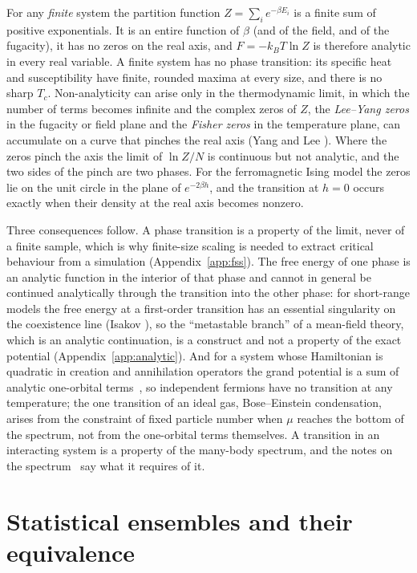 \documentclass[10pt,a4paper]{article}
\theoremstyle{remark}
\begin{document}
For any \emph{finite} system the partition function
$Z=\sum_ie^{-\beta E_i}$ is a finite sum of positive exponentials. It is an
entire function of $\beta$ (and of the field, and of the fugacity), it has no
zeros on the real axis, and $F=-k_BT\ln Z$ is therefore analytic in every
real variable. A finite system has no phase transition: its specific heat and
susceptibility have finite, rounded maxima at every size, and there is no
sharp $T_c$. Non-analyticity can arise only in the thermodynamic limit, in
which the number of terms becomes infinite and the complex zeros of $Z$, the
\emph{Lee--Yang zeros} in the fugacity or field plane and the \emph{Fisher
zeros} in the temperature plane, can accumulate on a curve that pinches the
real axis (Yang and Lee \cite{YangLee}). Where the zeros pinch the axis the
limit of $\ln Z/N$ is continuous but not analytic, and the two sides of the
pinch are two phases. For the ferromagnetic Ising model the zeros lie on the
unit circle in the plane of $e^{-2\beta h}$, and the transition at $h=0$
occurs exactly when their density at the real axis becomes nonzero.

Three consequences follow. A phase transition is a property of the limit,
never of a finite sample, which is why finite-size scaling is needed to
extract critical behaviour from a simulation (Appendix~\ref{app:fss}). The
free energy of one phase is an analytic function in the interior of that phase
and cannot in general be continued analytically through the transition into
the other phase: for short-range models the free energy at a first-order
transition has an essential singularity on the coexistence line (Isakov
\cite{Isakov}), so the ``metastable branch'' of a mean-field theory, which
is an analytic continuation, is a construct and not a property of the exact
potential (Appendix~\ref{app:analytic}). And for a system whose Hamiltonian is
quadratic in creation and annihilation operators the grand potential is a sum
of analytic one-orbital terms~\cite{DOSNotes}, so independent
fermions have no transition at any temperature; the one transition of an ideal
gas, Bose--Einstein condensation, arises from the constraint of fixed particle
number when $\mu$ reaches the bottom of the spectrum, not from the one-orbital
terms themselves. A transition in an interacting system is a property of the
many-body spectrum, and the notes on the spectrum~\cite{DOSNotes} say what it requires of it.

\section{Statistical ensembles and their equivalence}
\label{sec:ensembles}
\end{document}
